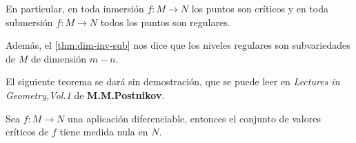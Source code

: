 \documentclass[../VD.tex]{subfiles}
\begin{document}
\begin{remark}
En particular, en toda inmersión \(f\colon M\to N\) los puntos son críticos y en
toda submersión \(f\colon M\to N\) todos los puntos son regulares. 


Además, el \cref{thm:dim-inv-sub}
nos dice que los niveles regulares son subvariedades de \(M\) de dimensión \(m-n\).
\end{remark}

El siguiente teorema se dará sin demostración, que se puede leer en
\emph{Lectures in Geometry,Vol.1} de \textbf{M.M.Postnikov}.

\begin{theorem}[name={teorema de Sard}, label={thm:sard}]
Sea \(f\colon M\to N\) una aplicación diferenciable, entonces el conjunto de
valores críticos de \(f\) tiene medida nula en \(N\).
\end{theorem}
\end{document}
